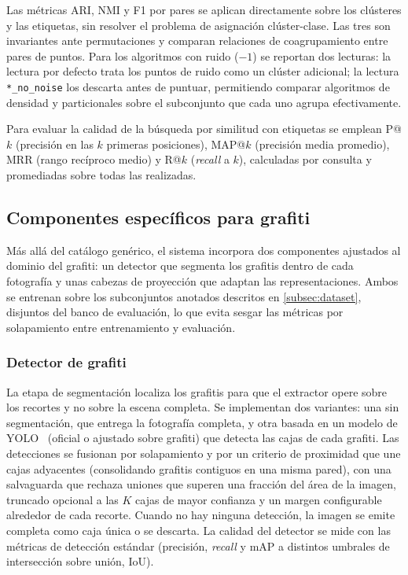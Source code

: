Las métricas ARI, NMI y F1 por pares se aplican directamente sobre los
clústeres y las etiquetas, sin resolver el problema de asignación
clúster-clase. Las tres son invariantes ante permutaciones y comparan
relaciones de coagrupamiento entre pares de puntos. Para los algoritmos con
ruido ($-1$) se reportan dos lecturas: la lectura por defecto trata los puntos
de ruido como un clúster adicional; la lectura \texttt{*\_no\_noise} los
descarta antes de puntuar, permitiendo comparar algoritmos de densidad y
particionales sobre el subconjunto que cada uno agrupa efectivamente.

Para evaluar la calidad de la búsqueda por similitud con etiquetas se emplean
P@$k$ (precisión en las $k$ primeras posiciones), MAP@$k$ (precisión media
promedio), MRR (rango recíproco medio) y R@$k$ (\textit{recall} a $k$),
calculadas por consulta y promediadas sobre todas las realizadas.

\subsection{Componentes específicos para grafiti}
\label{subsec:entrenamiento}
Más allá del catálogo genérico, el sistema incorpora dos componentes ajustados
al dominio del grafiti: un detector que segmenta los grafitis dentro de cada
fotografía y unas cabezas de proyección que adaptan las representaciones. Ambos
se entrenan sobre los subconjuntos anotados descritos en \ref{subsec:dataset},
disjuntos del banco de evaluación, lo que evita sesgar las métricas por
solapamiento entre entrenamiento y evaluación.

\subsubsection{Detector de grafiti}
\label{subsubsec:segmentador}
\label{subsubsec:entrenamiento-detector}
La etapa de segmentación localiza los grafitis para que el extractor opere sobre
los recortes y no sobre la escena completa. Se implementan dos variantes: una
sin segmentación, que entrega la fotografía completa, y otra basada en un modelo
de YOLO~\cite{ultralytics_ultralytics_2024} (oficial o ajustado sobre grafiti)
que detecta las cajas de cada grafiti. Las detecciones se fusionan por
solapamiento y por un criterio de proximidad que une cajas adyacentes
(consolidando grafitis contiguos en una misma pared), con una salvaguarda que
rechaza uniones que superen una fracción del área de la imagen, truncado
opcional a las $K$ cajas de mayor confianza y un margen configurable alrededor
de cada recorte. Cuando no hay ninguna detección, la imagen se emite completa
como caja única o se descarta. La calidad del detector se mide con las métricas
de detección estándar (precisión, \textit{recall} y mAP a distintos umbrales de
intersección sobre unión, IoU).

